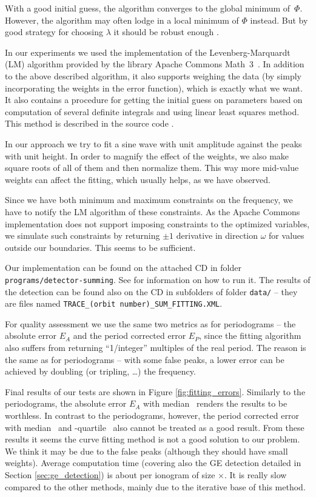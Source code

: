 With a good initial guess, the algorithm converges to the global minimum of~$\Phi$. However, the algorithm may often lodge in a local minimum of $\Phi$ instead. But by good strategy for choosing $\lambda$ it should be robust enough \citep[pp.~437--428]{Marquardt1963}.

In our experiments we used the implementation of the Levenberg-Marquardt (LM) algorithm provided by the library Apache Commons Math~3~\citep{Apache2013}. In addition to the above described algorithm, it also supports weighing the data (by simply incorporating the weights in the error function), which is exactly what we want. It also contains a procedure for getting the initial guess on parameters based on computation of several definite integrals and using linear least squares method. This method is described in the source code \citep{math3}.

In our approach we try to fit a sine wave with unit amplitude against the peaks with unit height. In order to magnify the effect of the weights, we also make square roots of all of them and then normalize them. This way more mid-value weights can affect the fitting, which usually helps, as we have observed.

Since we have both minimum and maximum constraints on the frequency, we have to notify the LM algorithm of these constraints. As the Apache Commons implementation does not support imposing constraints to the optimized variables, we simulate such constraints by returning $\pm1$ derivative in direction $\omega$ for values outside our boundaries. This seems to be sufficient.

Our implementation can be found on the attached CD in folder \texttt{programs/detector-summing}. See  for information on how to run it. The results of the detection can be found also on the CD in subfolders of folder \texttt{data/} -- they are files named \texttt{TRACE\_(orbit number)\_SUM\_FITTING.XML}.

For quality assessment we use the same two metrics as for periodograms -- the absolute error $E_A$ and the period corrected error $E_P$, since the fitting algorithm also suffers from returning ``1/integer'' multiples of the real period. The reason is the same as for periodograms -- with some false peaks, a lower error can be achieved by doubling (or tripling, \ldots) the frequency.   

Final results of our tests are shown in Figure \ref{fig:fitting_errors}. Similarly to the periodograms, the absolute error $E_A$ with median~ renders the results to be worthless. In contrast to the periodograms, however, the period corrected error with median~ and \mbox{-quartile}~ also cannot be treated as a good result. From these results it seems the curve fitting method is not a good solution to our problem. We think it may be due to the false peaks (although they should have small weights). Average computation time (covering also the GE detection detailed in Section \ref{sec:ge_detection}) is about  per ionogram of size $\times$. It is really slow compared to the other methods, mainly due to the iterative base of this method.


